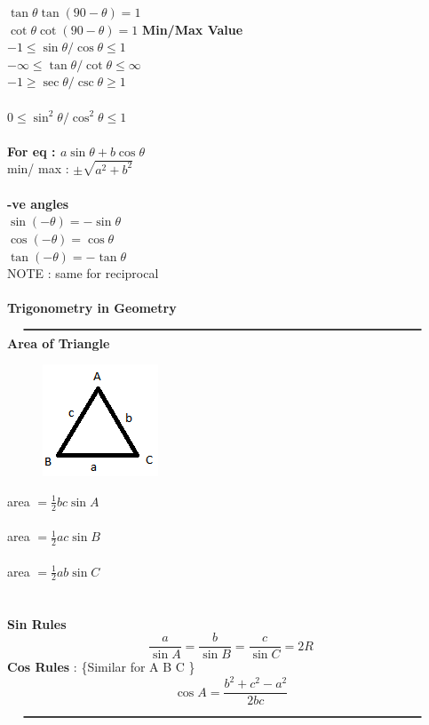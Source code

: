 \documentclass[11pt,a4paper,landscape,fleqn]{article}
\begin{document}
\begin{multicols*}{3}
$\tan\theta \tan(90-\theta) = 1$\\
$\cot\theta \cot(90-\theta) = 1$
\vfill\null
\columnbreak
{\bfseries {Min/Max Value}}\\
$-1 \leqslant  \sin\theta / \cos\theta \leqslant 1$\\
$-\infty \leq  \tan\theta / \cot\theta \leq \infty$\\
$-1 \geqslant \sec\theta / \csc\theta \geqslant 1$\\ \\
$ 0 \leqslant \sin^2\theta/ \cos^2\theta \leqslant 1$ \\ \\
{\bfseries {For eq : $a\sin\theta + b\cos\theta$}}\\
min/ max : $\pm \sqrt{a^2 + b^2} $\\ \\
{\bfseries {-ve angles}}\\
$\sin(-\theta) = - \sin\theta$\\
$\cos(-\theta) = \cos\theta$\\
$\tan(-\theta) = -\tan\theta$\\
NOTE : same for reciprocal \\ \\
{\noindent \bfseries {\Large Trigonometry in Geometry}}\\
$\rule{\columnwidth}{1pt}$
{\bfseries {Area of Triangle}}\\
\begin{figure}
\includegraphics [scale=.6]{geo1}
\end{figure}
area $ = \frac{1}{2}bc \sin A$ \\ \\
area $ = \frac{1}{2}ac \sin B$ \\ \\
area $ = \frac{1}{2}ab \sin C$ \\ \\  \\
{\bfseries {Sin Rules}}
$$\frac{a}{\sin A} = \frac{b}{\sin B} = \frac{c}{\sin C}= 2R$$
{\bfseries {Cos Rules}} : \{Similar for A B C \}
$$\cos A = \frac{b^2+c^2-a^2}{2bc}$$
$\rule{\columnwidth}{1pt}$

\end{multicols*}
\end{document}
